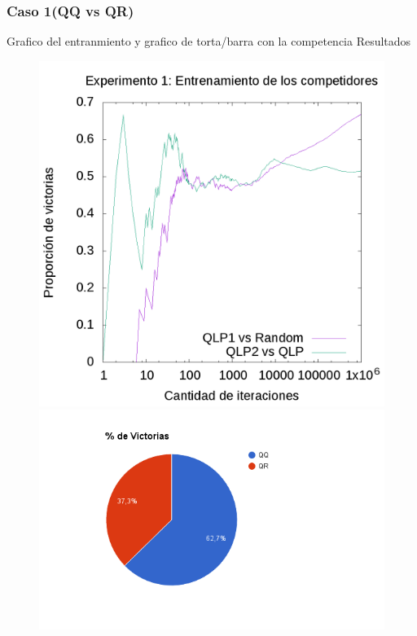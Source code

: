 \documentclass[10pt, a4paper]{article}
\begin{document}
\subsubsection{Caso 1(QQ vs QR)}

Grafico del entranmiento y grafico de torta/barra con la competencia Resultados

\begin{figure}[H]
  \begin{minipage}[c]{1\textwidth}
  \includegraphics[scale=0.2]{E1train.png}
  \includegraphics[scale=0.3]{QRvsQQ.png}
  \end{minipage}
\end{figure}
\end{document}
